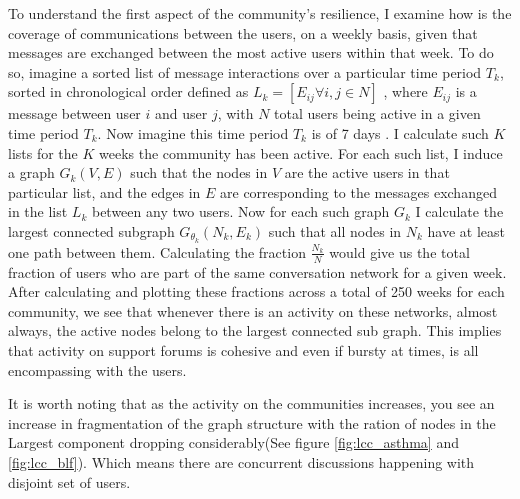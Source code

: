 To understand the first aspect of the community's resilience, I examine how is the coverage of communications between the users, on a weekly basis, given that messages are exchanged between the most active users within that week. 
To do so, imagine a sorted list of message interactions over a particular time period $T_k$, sorted in chronological order defined as $L_k=[E_{ij} \forall i,j \in N]$ , where $E_{ij}$ is a message between user $i$ and user $j$, with $N$ total users being active in a given time period $T_k$. Now imagine this time period $T_k$ is of 7 days . I calculate such $K$ lists for the $K$ weeks the community has been active. For each such list, I induce a graph $G_k(V,E)$ such that the nodes in $V$ are the active users in that particular list, and the edges in $E$ are corresponding to the messages exchanged in the list $L_k$ between any two users. 
Now for each such graph $G_k$ I calculate the largest connected subgraph $G_{\theta_k}(N_k,E_k)$ such that all nodes in $N_k$ have at least one path between them. Calculating the fraction $\frac{N_k}{N}$ would give us the total fraction of users who are part of the same conversation network for a given week. After calculating and plotting these fractions across a total of 250 weeks for each community, we see that whenever there is an activity on these networks, almost always, the active nodes belong to the largest connected sub graph. This implies that activity on support forums is cohesive and even if bursty at times, is all encompassing with the users. 

It is worth noting that as the activity on the communities increases, you see an increase in fragmentation of the graph structure with the ration of nodes in the Largest component dropping considerably(See figure \ref{fig:lcc_asthma} and \ref{fig:lcc_blf}). Which means there are concurrent discussions  happening with disjoint set of users. 



